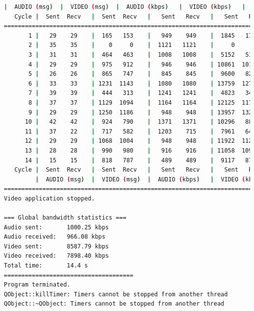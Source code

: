 \begin{lstlisting}[language=bash,basicstyle=\ttfamily\tiny]
         |  AUDIO (msg)  |  VIDEO (msg)  |  AUDIO (kbps)   |  VIDEO (kbps)   |     CPU (%) 
   Cycle |  Sent  Recv   |  Sent  Recv   |   Sent   Recv   |   Sent   Recv   | Program System
================================================================================================
       1 |   29    29    |  165   153    |   949    949    |  1845   1713    |  16      0       
       2 |   35    35    |    0     0    |  1121   1121    |     0      0    |  45     78       
       3 |   31    31    |  464   463    |  1008   1008    |  5152   5137    |  40     71       
       4 |   29    29    |  975   912    |   946    946    | 10861  10161    |  23     76       
       5 |   26    26    |  865   747    |   845    845    |  9600   8291    |  36     66       
       6 |   33    33    | 1231  1143    |  1080   1080    | 13759  12772    |  48     74       
       7 |   39    39    |  444   313    |  1241   1241    |  4823   3402    |  49     72       
       8 |   37    37    | 1129  1094    |  1164   1164    | 12125  11749    |  41     75       
       9 |   29    29    | 1250  1186    |   948    948    | 13957  13240    |  31     78       
      10 |   42    42    |  924   790    |  1371   1371    | 10296   8803    |  36     67       
      11 |   37    22    |  717   582    |  1203    715    |  7961   6462    |  43     71       
      12 |   29    29    | 1068  1004    |   948    948    | 11922  11209    |  31     69       
      13 |   28    28    |  990   980    |   916    916    | 11058  10948    |  33     73       
      14 |   15    15    |  818   787    |   489    489    |  9117   8769    |  23     72       
   Cycle |  Sent  Recv   |  Sent  Recv   |   Sent   Recv   |   Sent   Recv   | Program System
         |  AUDIO (msg)  |  VIDEO (msg)  |  AUDIO (kbps)   |  VIDEO (kbps)   |     CPU (%) 
===========================================================================================
Video application stopped.

=== Global bandwidth statistics ===
Audio sent:       1000.25 kbps
Audio received:   966.08 kbps
Video sent:       8587.79 kbps
Video received:   7898.40 kbps
Total time:       14.4 s
=====================================
Program terminated.
QObject::killTimer: Timers cannot be stopped from another thread
QObject::~QObject: Timers cannot be stopped from another thread
\end{lstlisting}
\vspace{\baselineskip}

